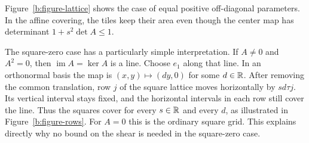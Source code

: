 Figure~\ref{b:figure-lattice} shows the case of equal positive
off-diagonal parameters. In the affine covering, the tiles keep their
area even though the center map has determinant
$1+s^2\det A\le1$.



The square-zero case has a particularly simple interpretation. If
$A\ne0$ and $A^2=0$, then $\operatorname{im}A=\ker A$ is a line.
Choose $e_1$ along that line. In an orthonormal basis the map is
$(x,y)\mapsto(dy,0)$ for some $d\in\mathbb R$. After removing the common
translation, row $j$ of the square lattice moves horizontally by
$sd\tau j$. Its vertical interval stays fixed, and the horizontal
intervals in each row still cover the line. Thus the squares cover
for every $s\in\mathbb R$ and every $d$, as illustrated in
Figure~\ref{b:figure-rows}. For $A=0$ this is the ordinary square
grid. This explains directly why no bound on the shear is needed
in the square-zero case.


